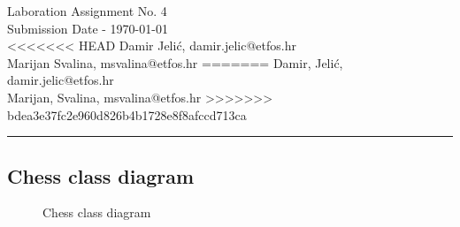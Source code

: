\documentclass[11pt,a4paper]{article}
\begin{document}
\large
Laboration Assignment No. 4 \\
Submission Date - \yyyymmdddate \today \\
<<<<<<< HEAD
Damir Jelić, damir.jelic@etfos.hr \\
Marijan Svalina, msvalina@etfos.hr
=======
Damir, Jelić, damir.jelic@etfos.hr \\
Marijan, Svalina, msvalina@etfos.hr
>>>>>>> bdea3e37fc2e960d826b4b1728e8f8afccd713ca
\\
\rule{\linewidth}{0.1mm}

\setcounter{section}{4}
\subsection{Chess class diagram}
\begin{figure}[htb]
    \begin{center}
        \setlength\fboxsep{0pt}
        \caption{Chess class diagram}
        \label{fig:class_diag}
    \end{center}
\end{figure}
\end{document}
